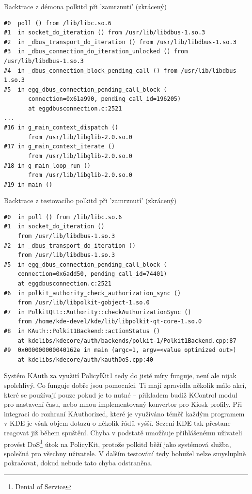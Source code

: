 \begin{mylisting}
\caption{Backtrace z démona polkitd při 'zamrznutí' (zkrácený)}
\label{btrac1}
\begin{lstlisting}
#0  poll () from /lib/libc.so.6
#1  in socket_do_iteration () from /usr/lib/libdbus-1.so.3
#2  in _dbus_transport_do_iteration () from /usr/lib/libdbus-1.so.3
#3  in _dbus_connection_do_iteration_unlocked () from /usr/lib/libdbus-1.so.3
#4  in _dbus_connection_block_pending_call () from /usr/lib/libdbus-1.so.3
#5  in egg_dbus_connection_pending_call_block (
       connection=0x61a990, pending_call_id=196205)
       at eggdbusconnection.c:2521
...      
#16 in g_main_context_dispatch ()
       from /usr/lib/libglib-2.0.so.0
#17 in g_main_context_iterate ()
       from /usr/lib/libglib-2.0.so.0
#18 in g_main_loop_run ()
       from /usr/lib/libglib-2.0.so.0
#19 in main ()
\end{lstlisting}
\end{mylisting}

\begin{mylisting}
\caption{Backtrace z testovacího polkitd při 'zamrznutí' (zkrácený)}
\label{btrac2}
\begin{lstlisting}
#0  in poll () from /lib/libc.so.6
#1  in socket_do_iteration ()
    from /usr/lib/libdbus-1.so.3
#2  in _dbus_transport_do_iteration ()
    from /usr/lib/libdbus-1.so.3
#5  in egg_dbus_connection_pending_call_block (
    connection=0x6add50, pending_call_id=74401)
    at eggdbusconnection.c:2521
#6  in polkit_authority_check_authorization_sync ()
    from /usr/lib/libpolkit-gobject-1.so.0
#7  in PolkitQt1::Authority::checkAuthorizationSync ()
    from /home/kde-devel/kde/lib/libpolkit-qt-core-1.so.0
#8  in KAuth::Polkit1Backend::actionStatus ()
    at kdelibs/kdecore/auth/backends/polkit-1/Polkit1Backend.cpp:87
#9  0x000000000040162e in main (argc=1, argv=<value optimized out>)
    at kdelibs/kdecore/auth/kauthDoS.cpp:40 
\end{lstlisting}
\end{mylisting}
Systém KAuth za využití PolicyKit1 tedy do jisté míry funguje, není ale nijak spolehlivý. Co funguje dobře jsou pomocníci. Ti mají zpravidla několik málo akcí, které se používají pouze pokud je to nutné -- příkladem budiž KControl modul pro nastavení času, nebo mnou implementovaný konvertor pro Kiosk profily. Při integraci do rozhraní KAuthorized, které je využíváno téměř každým programem v KDE je však objem dotazů o několik řádů vyšší. Sezení KDE tak přestane reagovat již během spuštění. Chyba v podstatě umožňuje přihlášenému uživateli provést DoS\footnote{Denial of Service} útok na PolicyKit, protože polkitd běží jako systémová služba, společná pro všechny uživatele. V dalším testování tedy bohužel nelze smysluplně pokračovat, dokud nebude tato chyba odstraněna.

